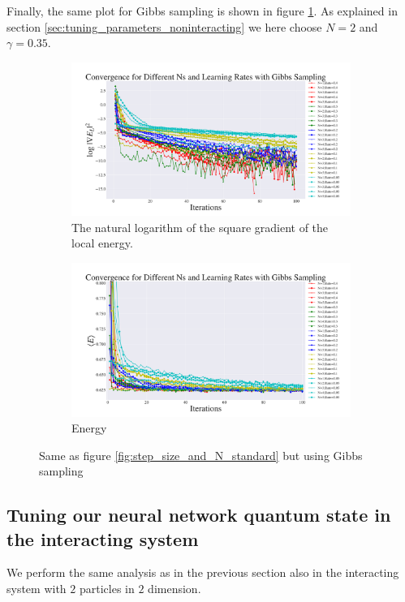 \documentclass[a4paper, 10pt]{article}
\begin{document}
Finally, the same plot for Gibbs sampling is shown in figure \ref{fig:step_size_and_N_gibbs}. As explained in section \ref{sec:tuning_parameters_noninteracting} we here choose $N=2$ and $\gamma=0.35$.
\begin{figure}[hb!]
	\centering
\begin{subfigure}[t]{.9\textwidth}
	\centering
	\includegraphics[width=\textwidth]{../Results/grad_gibbs.pdf}
	\caption{The natural logarithm of the square gradient of the local energy.}
\end{subfigure}%

\begin{subfigure}[b]{.9\textwidth}
	\centering
	\includegraphics[width=\textwidth]{../Results/energy_gibbs.pdf}
	\caption{Energy}
\end{subfigure}%
	\caption{Same as figure \ref{fig:step_size_and_N_standard} but using Gibbs sampling}\label{fig:step_size_and_N_gibbs}
\end{figure}

\subsection{Tuning our neural network quantum state in the interacting system}\label{sec:res_tuning_parameters_interacting}
We perform the same analysis as in the previous section also in the interacting system with $2$ particles in $2$ dimension. 
\end{document}
